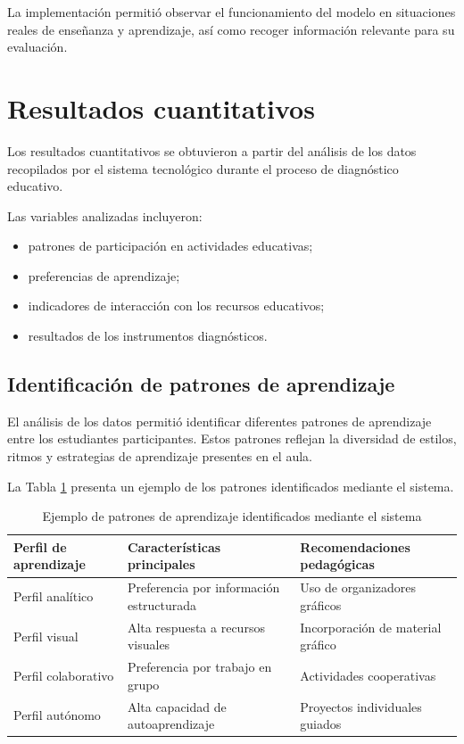\begin{refsection}
La implementación permitió observar el funcionamiento del modelo en situaciones reales de enseñanza y aprendizaje, así como recoger información relevante para su evaluación.

\section{Resultados cuantitativos}

Los resultados cuantitativos se obtuvieron a partir del análisis de los datos recopilados por el sistema tecnológico durante el proceso de diagnóstico educativo.

Las variables analizadas incluyeron:

\begin{itemize}
\item patrones de participación en actividades educativas;
\item preferencias de aprendizaje;
\item indicadores de interacción con los recursos educativos;
\item resultados de los instrumentos diagnósticos.
\end{itemize}

\subsection{Identificación de patrones de aprendizaje}

El análisis de los datos permitió identificar diferentes patrones de aprendizaje entre los estudiantes participantes. Estos patrones reflejan la diversidad de estilos, ritmos y estrategias de aprendizaje presentes en el aula.

La Tabla \ref{tab:patrones-aprendizaje} presenta un ejemplo de los patrones identificados mediante el sistema.

\begin{table}[htbp]
\centering
\caption{Ejemplo de patrones de aprendizaje identificados mediante el sistema}
\label{tab:patrones-aprendizaje}

\begin{tabular}{lll}
\toprule
Perfil de aprendizaje & Características principales & Recomendaciones pedagógicas \\
\midrule
Perfil analítico & Preferencia por información estructurada & Uso de organizadores gráficos \\
Perfil visual & Alta respuesta a recursos visuales & Incorporación de material gráfico \\
Perfil colaborativo & Preferencia por trabajo en grupo & Actividades cooperativas \\
Perfil autónomo & Alta capacidad de autoaprendizaje & Proyectos individuales guiados \\
\bottomrule
\end{tabular}


\end{table}
\end{refsection}
